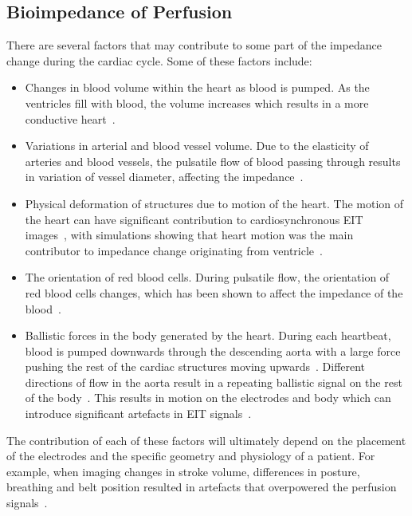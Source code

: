 \subsection{Bioimpedance of Perfusion} \label{sec:origins}
There are several factors that may contribute to some part of 
the impedance change during the cardiac cycle. 
Some of these factors include:
\begin{itemize}
    \item Changes in blood volume within the heart as blood is pumped. As the ventricles 
          fill with blood,
          the volume increases which results in a more conductive
          heart~\parencite{nyboer_impedance_1970}.
    \item Variations in arterial and blood vessel volume. Due to the elasticity of arteries 
          and
          blood vessels, the pulsatile flow of blood passing through results in variation of 
          vessel diameter, affecting the impedance~\parencite{eyuboglu_localisation_1987}.
    \item Physical deformation of structures due to motion of the heart. The
          motion of the heart can have significant contribution 
          to cardiosynchronous EIT 
          images~\parencite{adler_origins_2017}, 
          with simulations showing that heart motion was the 
          main contributor to impedance change originating from
          ventricle~\parencite{proenca_influence_2015}. 
    \item The orientation of red blood cells. During pulsatile flow, the orientation of
          red blood cells changes, which has been shown to affect the impedance of the 
          blood~\parencite{gaw_effect_2010}. 
    \item Ballistic forces in the body generated by the heart. During each
          heartbeat, blood is pumped downwards through the descending
          aorta with a large force pushing the rest of the cardiac structures moving
          upwards~\parencite{gordon_certain_1877}. Different directions 
          of flow in the aorta result in a repeating ballistic 
          signal on the rest of the body~\parencite{kim_ballistocardiogram_2016}. This results in 
          motion on the electrodes and body which can introduce significant
          artefacts in EIT signals~\parencite{adler_impedance_1994}.
\end{itemize}

The contribution of each of these factors will ultimately depend on the placement
of the electrodes and the specific geometry and physiology of a patient. 
For example, when imaging changes in stroke volume, differences in 
posture, breathing and belt 
position resulted in artefacts that overpowered the 
perfusion signals~\parencite{patterson_variability_2001}.  

